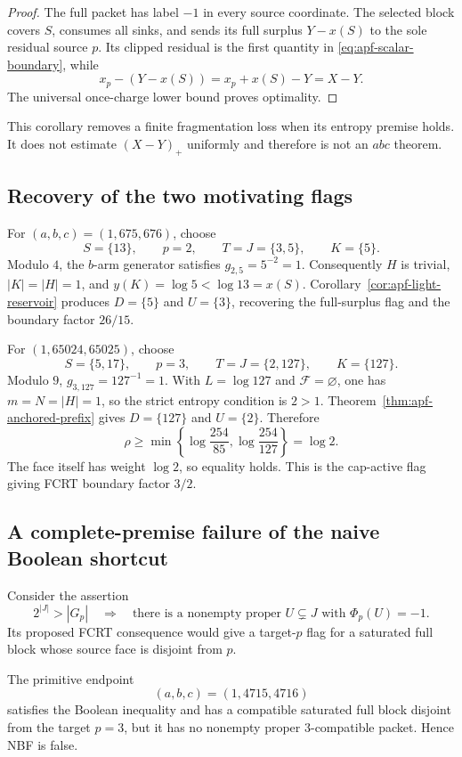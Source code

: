 \begin{proof}
The full packet has label $-1$ in every source coordinate.  The selected
block covers $S$, consumes all sinks, and sends its full surplus
$Y-x(S)$ to the sole residual source $p$.  Its clipped residual is the first
quantity in \eqref{eq:apf-scalar-boundary}, while
\[
                  x_p-(Y-x(S))=x_p+x(S)-Y=X-Y.
\]
The universal once-charge lower bound proves optimality.
\end{proof}

This corollary removes a finite fragmentation loss when its entropy premise
holds.  It does not estimate $(X-Y)_+$ uniformly and therefore is not an
$abc$ theorem.

\subsection{Recovery of the two motivating flags}

For $(a,b,c)=(1,675,676)$, choose
\[
 S=\{13\},\qquad p=2,\qquad T=J=\{3,5\},\qquad K=\{5\}.
\]
Modulo $4$, the $b$-arm generator satisfies $g_{2,5}=5^{-2}=1$.
Consequently $H$ is trivial, $|K|=|H|=1$, and
$y(K)=\log5<\log13=x(S)$.  Corollary~\ref{cor:apf-light-reservoir}
produces $D=\{5\}$ and $U=\{3\}$, recovering the full-surplus flag and the
boundary factor $26/15$.

For $(1,65024,65025)$, choose
\[
 S=\{5,17\},\qquad p=3,\qquad
 T=J=\{2,127\},\qquad K=\{127\}.
\]
Modulo $9$, $g_{3,127}=127^{-1}=1$.  With
$L=\log127$ and $\mathcal F=\varnothing$, one has $m=N=|H|=1$, so the
strict entropy condition is $2>1$.  Theorem~\ref{thm:apf-anchored-prefix}
gives $D=\{127\}$ and $U=\{2\}$.  Therefore
\[
 \rho\ge
 \min\left\{\log\frac{254}{85},\log\frac{254}{127}\right\}
 =\log2.
\]
The face itself has weight $\log2$, so equality holds.  This is the
cap-active flag giving FCRT boundary factor $3/2$.

\subsection{A complete-premise failure of the naive Boolean shortcut}

Consider the assertion
\[
 \tag{NBF}\label{eq:apf-nbf}
 2^{|J|}>|G_p|
 \quad\Longrightarrow\quad
 \text{there is a nonempty proper $U\subsetneq J$ with $\Phi_p(U)=-1$}.
\]
Its proposed FCRT consequence would give a target-$p$ flag for a saturated
full block whose source face is disjoint from $p$.

\begin{proposition}
\label{prop:apf-nbf-counterexample}
The primitive endpoint
\[
                         (a,b,c)=(1,4715,4716)
\]
satisfies the Boolean inequality and has a compatible saturated full block
disjoint from the target $p=3$, but it has no nonempty proper
$3$-compatible packet.  Hence \textup{NBF} is false.
\end{proposition}


